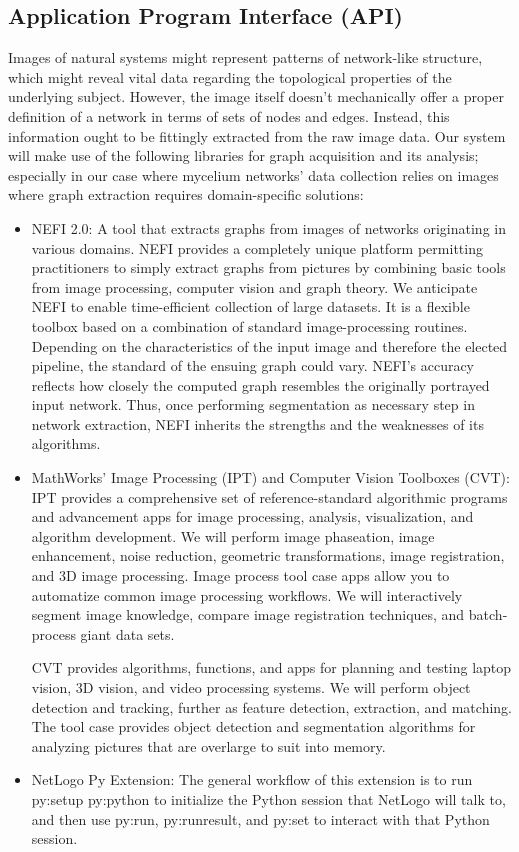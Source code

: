 \subsection{Application Program Interface (API)}
Images of natural systems might represent patterns of network-like structure, which might reveal vital data regarding the topological properties of the underlying subject. However, the image itself doesn't mechanically offer a proper definition of a network in terms of sets of nodes and edges. Instead, this information ought to be fittingly extracted from the raw image data. Our system will make use of the following libraries for graph acquisition and its analysis; especially in our case where mycelium networks’ data collection relies on images where graph extraction requires domain-specific solutions:
\begin{itemize}
    \item NEFI 2.0: A tool that extracts graphs from images of networks originating in various domains. NEFI provides a completely unique platform permitting practitioners to simply extract graphs from pictures by combining basic tools from image processing, computer vision and graph theory. We anticipate NEFI to enable time-efficient collection of large datasets. It is a flexible toolbox based on a combination of standard image-processing routines. Depending on the characteristics of the input image and therefore the elected pipeline, the standard of the ensuing graph could vary. NEFI's accuracy reflects how closely the computed graph resembles the originally portrayed input network. Thus, once performing segmentation as necessary step in network extraction, NEFI inherits the strengths and the weaknesses of its algorithms.
    \item MathWorks’ Image Processing (IPT) and Computer Vision Toolboxes (CVT): IPT provides a comprehensive set of reference-standard algorithmic programs and advancement apps for image processing, analysis, visualization, and algorithm development. We will perform image phaseation, image enhancement, noise reduction, geometric transformations, image registration, and 3D image processing. Image process tool case apps allow you to automatize common image processing workflows. We will interactively segment image knowledge, compare image registration techniques, and batch-process giant data sets.
    
    CVT provides algorithms, functions, and apps for planning and testing laptop vision, 3D vision, and video processing systems. We will perform object detection and tracking, further as feature detection, extraction, and matching. The tool case provides object detection and segmentation algorithms for analyzing pictures that are overlarge to suit into memory.
    \item NetLogo Py Extension: The general workflow of this extension is to run py:setup py:python to initialize the Python session that NetLogo will talk to, and then use py:run, py:runresult, and py:set to interact with that Python session.
\end{itemize}


